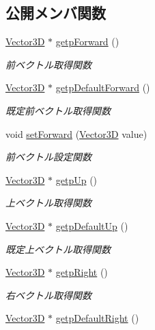 \subsection*{公開メンバ関数}
\begin{DoxyCompactItemize}
\item 
\mbox{\hyperlink{class_vector3_d}{Vector3D}} $\ast$ \mbox{\hyperlink{class_axis_a97ddaeb8484fec8c8c51d8ae45ea6058}{getp\+Forward}} ()
\begin{DoxyCompactList}\small\item\em 前ベクトル取得関数 \end{DoxyCompactList}\item 
\mbox{\hyperlink{class_vector3_d}{Vector3D}} $\ast$ \mbox{\hyperlink{class_axis_a71030c261074a737756e3f083da8d185}{getp\+Default\+Forward}} ()
\begin{DoxyCompactList}\small\item\em 既定前ベクトル取得関数 \end{DoxyCompactList}\item 
void \mbox{\hyperlink{class_axis_af37757c4c30c1a9d0e111a2d954bf734}{set\+Forward}} (\mbox{\hyperlink{class_vector3_d}{Vector3D}} value)
\begin{DoxyCompactList}\small\item\em 前ベクトル設定関数 \end{DoxyCompactList}\item 
\mbox{\hyperlink{class_vector3_d}{Vector3D}} $\ast$ \mbox{\hyperlink{class_axis_af9b293c3e3ad85321382f112d7afa538}{getp\+Up}} ()
\begin{DoxyCompactList}\small\item\em 上ベクトル取得関数 \end{DoxyCompactList}\item 
\mbox{\hyperlink{class_vector3_d}{Vector3D}} $\ast$ \mbox{\hyperlink{class_axis_a6461d731bdccbe4d5d28bca3f9125344}{getp\+Default\+Up}} ()
\begin{DoxyCompactList}\small\item\em 既定上ベクトル取得関数 \end{DoxyCompactList}\item 
\mbox{\hyperlink{class_vector3_d}{Vector3D}} $\ast$ \mbox{\hyperlink{class_axis_a5562bdd19fc244dc78f4e6cce018ca5d}{getp\+Right}} ()
\begin{DoxyCompactList}\small\item\em 右ベクトル取得関数 \end{DoxyCompactList}\item 
\mbox{\hyperlink{class_vector3_d}{Vector3D}} $\ast$ \mbox{\hyperlink{class_axis_aa674343b016db11ac4e3ec2a149088e3}{getp\+Default\+Right}} ()

\end{DoxyCompactItemize}
